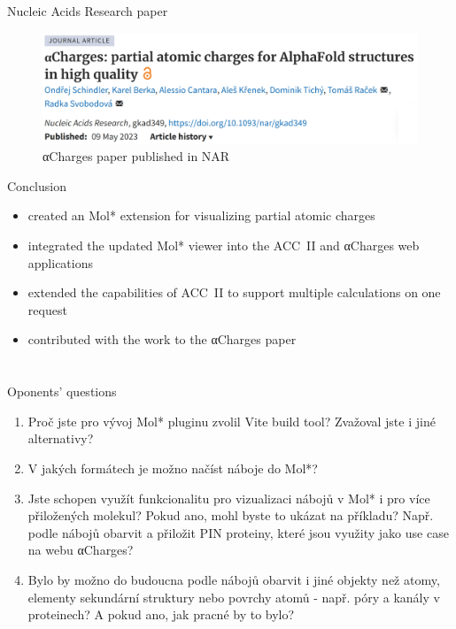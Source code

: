 \documentclass[
]{beamer}
\begin{document}
\section[]{}

\begin{frame}{Nucleic Acids Research paper}
\begin{figure}
  \includegraphics[width=1\textwidth,keepaspectratio]{images/paper.png}
  \caption{αCharges paper published in NAR \cite{schindler2023acharges}}
\end{figure}
\end{frame}

\begin{frame}{Conclusion}
  \begin{itemize}
    \item created an Mol* extension for visualizing partial atomic charges
    \item integrated the updated Mol* viewer into the ACC~II and αCharges web applications
    \item extended the capabilities of ACC~II to support multiple calculations on one request
    \item contributed with the work to the αCharges paper
  \end{itemize}
\end{frame}

\section{}

\begin{frame}{Oponents' questions}
  \begin{enumerate}
    \item Proč jste pro vývoj Mol* pluginu zvolil Vite build tool? Zvažoval jste i jiné alternativy?
    \item V jakých formátech je možno načíst náboje do Mol*?
    \item Jste schopen využít funkcionalitu pro vizualizaci nábojů v Mol* i pro více přiložených molekul? Pokud ano, mohl byste to ukázat na příkladu? Např. podle nábojů obarvit a přiložit PIN proteiny, které jsou využity jako use case na webu αCharges?
    \item Bylo by možno do budoucna podle nábojů obarvit i jiné objekty než atomy, elementy sekundární struktury nebo povrchy atomů - např. póry a kanály v proteinech? A pokud ano, jak pracné by to bylo?
  \end{enumerate}
\end{frame}
\end{document}
